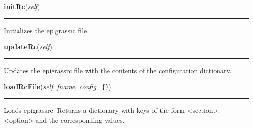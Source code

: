     \vspace{0.5ex}

    \begin{boxedminipage}{\textwidth}

    \raggedright \textbf{initRc}(\textit{self})

    \vspace{-1.5ex}

    \rule{\textwidth}{0.5\fboxrule}
    Initializes the epigrassrc file.

    \vspace{1ex}

    \end{boxedminipage}

    \label{epigrass:MainPanel_Impl:updateRc}

    \vspace{0.5ex}

    \begin{boxedminipage}{\textwidth}

    \raggedright \textbf{updateRc}(\textit{self})

    \vspace{-1.5ex}

    \rule{\textwidth}{0.5\fboxrule}
    Updates the epigrassrc file with the contents of the configuration 
    dictionary.

    \vspace{1ex}

    \end{boxedminipage}

    \label{epigrass:MainPanel_Impl:loadRcFile}

    \vspace{0.5ex}

    \begin{boxedminipage}{\textwidth}

    \raggedright \textbf{loadRcFile}(\textit{self}, \textit{fname}, \textit{config}=\texttt{\{\}})

    \vspace{-1.5ex}

    \rule{\textwidth}{0.5\fboxrule}
    Loads epigrassrc. Returns a dictionary with keys of the form 
    {\textless}section{\textgreater}.{\textless}option{\textgreater} and 
    the corresponding values.

    \vspace{1ex}

    \end{boxedminipage}

